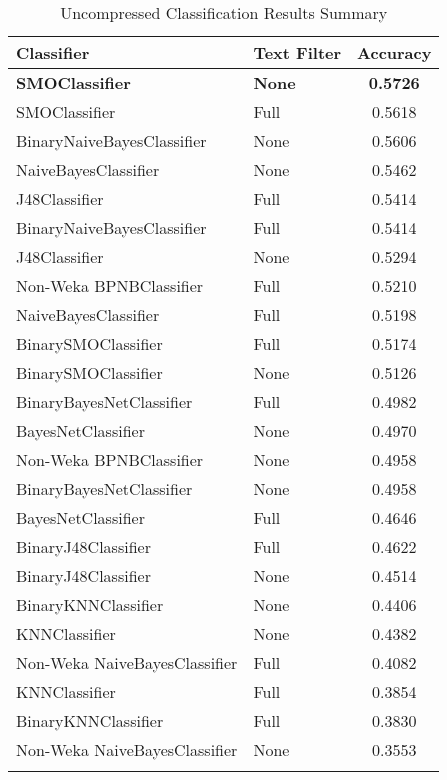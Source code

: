 \begin{center}
   \begin{longtable}{|l|l|c|}
      \hline
         Classifier & Text Filter & Accuracy
      \tabularnewline\hline
      \endhead
         \textbf{SMOClassifier} & \textbf{None} & \textbf{0.5726}
      \tabularnewline\hline
         SMOClassifier & Full & 0.5618
      \tabularnewline\hline
         BinaryNaiveBayesClassifier & None & 0.5606
      \tabularnewline\hline
         NaiveBayesClassifier & None & 0.5462
      \tabularnewline\hline
         J48Classifier & Full & 0.5414
      \tabularnewline\hline
         BinaryNaiveBayesClassifier & Full & 0.5414
      \tabularnewline\hline
         J48Classifier & None & 0.5294
      \tabularnewline\hline
         Non-Weka BPNBClassifier & Full & 0.5210
      \tabularnewline\hline
         NaiveBayesClassifier & Full & 0.5198
      \tabularnewline\hline
         BinarySMOClassifier & Full & 0.5174
      \tabularnewline\hline
         BinarySMOClassifier & None & 0.5126
      \tabularnewline\hline
         BinaryBayesNetClassifier & Full & 0.4982
      \tabularnewline\hline
         BayesNetClassifier & None & 0.4970
      \tabularnewline\hline
         Non-Weka BPNBClassifier & None & 0.4958
      \tabularnewline\hline
         BinaryBayesNetClassifier & None & 0.4958
      \tabularnewline\hline
         BayesNetClassifier & Full & 0.4646
      \tabularnewline\hline
         BinaryJ48Classifier & Full & 0.4622
      \tabularnewline\hline
         BinaryJ48Classifier & None & 0.4514
      \tabularnewline\hline
         BinaryKNNClassifier & None & 0.4406
      \tabularnewline\hline
         KNNClassifier & None & 0.4382
      \tabularnewline\hline
         Non-Weka NaiveBayesClassifier & Full & 0.4082
      \tabularnewline\hline
         KNNClassifier & Full & 0.3854
      \tabularnewline\hline
         BinaryKNNClassifier & Full & 0.3830
      \tabularnewline\hline
         Non-Weka NaiveBayesClassifier & None & 0.3553
      \tabularnewline\hline
      \caption[Uncompressed Classification Results Summary]{Uncompressed Classification Results Summary}
      \label{table:classification-summary-uncompressed}
   \end{longtable}
\end{center}

